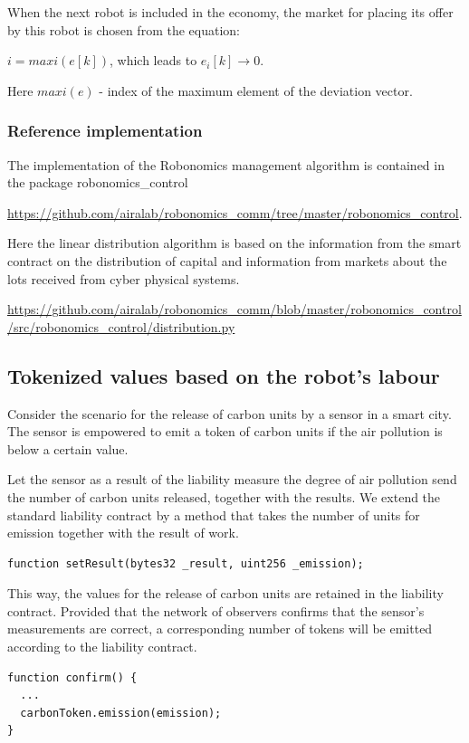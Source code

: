\documentclass{article}
\begin{document}
When the next robot is included in the economy, the market for placing its offer by this robot is chosen from the equation:

$ i = maxi(e[k])$, which leads to $ e_i[k] \rightarrow 0 $.

Here  $ maxi(e) $ - index of the maximum element of the deviation vector.

\subsubsection{Reference implementation}

The implementation of the Robonomics management algorithm is contained in the package robonomics\_control

\url{https://github.com/airalab/robonomics_comm/tree/master/robonomics_control}. 

Here the linear distribution algorithm is based on the information from the smart contract on the distribution of capital and information from markets about the lots received from cyber physical systems.

\url{https://github.com/airalab/robonomics_comm/blob/master/robonomics_control/src/robonomics_control/distribution.py}

\subsection{Tokenized values based on the robot's labour}

Consider the scenario for the release of carbon units by a sensor in a smart city. The sensor is empowered to emit a token of carbon units if the air pollution is below a certain value.

Let the sensor as a result of the liability measure the degree of air pollution send the number of carbon units released, together with the results. We extend the standard liability contract by a method that takes the number of units for emission together with the result of work.
\begin{lstlisting}
function setResult(bytes32 _result, uint256 _emission);
\end{lstlisting}


This way, the values for the release of carbon units are retained in the liability contract. Provided that the network of observers confirms that the sensor's measurements are correct, a corresponding number of tokens will be emitted according to the liability contract.

\begin{lstlisting}
function confirm() {
  ... 
  carbonToken.emission(emission);
}
\end{lstlisting}
\end{document}
